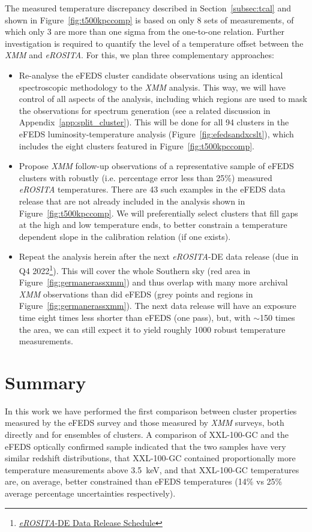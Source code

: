 \documentclass[fleqn,usenatbib]{mnras}
\begin{document}
The measured temperature discrepancy described in Section~\ref{subsec:tcal} and shown in Figure~\ref{fig:t500kpccomp} is based on only 8 sets of measurements, of which only 3 are more than one sigma from the one-to-one relation. Further investigation is required to quantify the level of a temperature offset between the {\em XMM} and {\em eROSITA}. For this, we plan three complementary approaches:
\begin{itemize}
\item{Re-analyse the eFEDS cluster candidate observations using an identical spectroscopic methodology to the {\em XMM} analysis. This way, we will have control of all aspects of the analysis, including which regions are used to mask the observations for spectrum generation (see a related discussion in Appendix~\ref{app:split_cluster}). This will be done for all 94 clusters in the eFEDS luminosity-temperature analysis (Figure~\ref{fig:efedsandxcslt}), which includes the eight clusters featured in Figure~\ref{fig:t500kpccomp}.}
\item{Propose {\em XMM} follow-up observations of a representative sample of eFEDS clusters with robustly (i.e. percentage error less than 25\%) measured {\em eROSITA} temperatures. There are 43 such examples in the eFEDS data release that are not already included in the analysis shown in Figure~\ref{fig:t500kpccomp}. We will preferentially select clusters that fill gaps at the high and low temperature ends, to better constrain a temperature dependent slope in the calibration relation (if one exists).}
\item{Repeat the analysis herein after the next {\em eROSITA}-DE data release (due in Q4 2022\footnote{\href{https://erosita.mpe.mpg.de/erass/}{{\em eROSITA}-DE Data Release Schedule}}). This will cover the whole Southern sky (red area in Figure~\ref{fig:germanerassxmm}) and thus overlap with many more archival {\em XMM} observations than did eFEDS (grey points and regions in Figure~\ref{fig:germanerassxmm}). The next data release will have an exposure time eight times less shorter than eFEDS (one pass), but, with ${\sim}$150 times the area, we can still expect it to yield roughly 1000 robust temperature measurements.}
\end{itemize}

\section{Summary}
\label{sec:summary}

In this work we have performed the first comparison between cluster properties measured by the eFEDS survey and those measured by {\em XMM} surveys, both directly and for ensembles of clusters. A comparison of XXL-100-GC and the eFEDS optically confirmed sample indicated that the two samples have very similar redshift distributions, that XXL-100-GC contained proportionally more temperature measurements above 3.5~keV, and that XXL-100-GC temperatures are, on average, better constrained than eFEDS temperatures (14\% vs 25\% average percentage uncertainties respectively).
\end{document}
